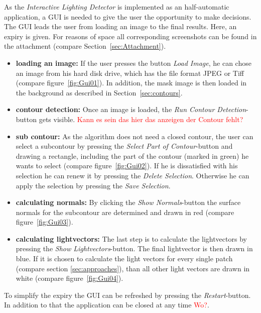 As the \textit{Interactive Lighting Detector} is implemented as an half-automatic application, a GUI is needed to give the user the opportunity to make decisions. The GUI leads the user from loading an image to the final results. Here, an expiry is given. For reasons of space all corresponding screenshots can be found in the attachment (compare Section~\ref{sec:Attachment}).  
\begin{itemize}
\item \textbf{loading an image:} If the user presses the button \textit{Load Image}, he can chose an image from his hard disk drive, which has the file format JPEG or Tiff (compare figure~\ref{fig:Gui01}). In addition, the mask image is then loaded in the background as described in Section~\ref{sec:contours}.
\item \textbf{contour detection:} Once an image is loaded, the \textit{Run Contour Detection}-button gets visible. \textcolor{red}{Kann es sein das hier das anzeigen der Contour fehlt?}
\item \textbf{sub contour:} As the algorithm does not need a closed contour, the user can select a subcontour by pressing the \textit{Select Part of Contour}-button and drawing a rectangle, including the part of the contour (marked in green) he wants to select (compare figure~\ref{fig:Gui02}). If he is dissatisfied with his selection he can renew it by pressing the \textit{Delete Selection}. Otherwise he can apply the selection by pressing the \textit{Save Selection}. 
\item \textbf{calculating normals:} By clicking the \textit{Show Normals}-button the surface normals for the subcontour are determined and drawn in red (compare figure~\ref{fig:Gui03}).
\item \textbf{calculating lightvectors:} The last step is to calculate the lightvectors by pressing the \textit{Show Lightvectors}-button. The final lightvector is then drawn in blue. If it is chosen to calculate the light vectors for every single patch (compare section \ref{sec:approaches}), than all other light vectors are drawn in white (compare figure~\ref{fig:Gui04}). 
\end{itemize}

To simplify the expiry the GUI can be refreshed by pressing the \textit{Restart}-button. In addition to that the application can be closed at any time \textcolor{red}{Wo?}. 


\newpage